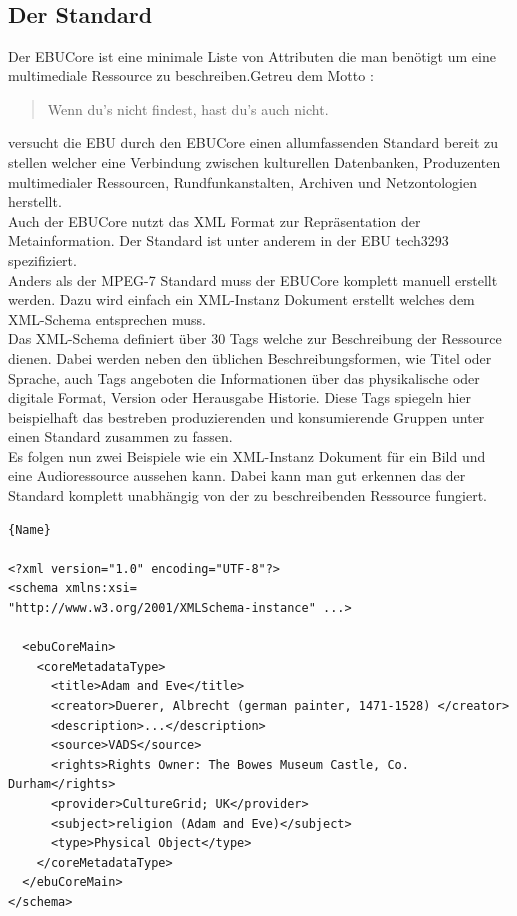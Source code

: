 	\subsection{\\Der Standard\\}
	Der EBUCore ist eine minimale Liste von Attributen die man benötigt um eine multimediale Ressource zu beschreiben.Getreu dem Motto :\begin{quote}Wenn du's nicht findest, hast du's auch nicht.\end{quote} versucht die EBU durch den EBUCore einen allumfassenden Standard bereit zu stellen welcher eine Verbindung zwischen kulturellen Datenbanken, Produzenten multimedialer Ressourcen, Rundfunkanstalten, Archiven und Netzontologien herstellt.\\
Auch der EBUCore nutzt das XML Format zur Repräsentation der Metainformation. Der Standard ist unter anderem in der EBU tech3293 spezifiziert.\\Anders als der MPEG-7 Standard muss der EBUCore komplett manuell erstellt werden. Dazu wird einfach ein XML-Instanz Dokument erstellt welches dem XML-Schema entsprechen muss.\\Das XML-Schema definiert über 30 Tags welche zur Beschreibung der Ressource dienen. Dabei werden neben den üblichen Beschreibungsformen, wie Titel oder Sprache, auch Tags angeboten die Informationen über das physikalische oder digitale  Format, Version oder Herausgabe Historie. Diese Tags spiegeln hier beispielhaft das bestreben produzierenden und konsumierende Gruppen unter einen Standard zusammen zu fassen.\\
Es folgen nun zwei Beispiele wie ein XML-Instanz Dokument für ein Bild und eine Audioressource aussehen kann. Dabei kann man gut erkennen das der Standard komplett unabhängig von der zu beschreibenden Ressource fungiert.

\begin{lstlisting}[caption=Beispiel-XML EBUCore für Albrecht Dürers Bild: Adam und Eva]{Name}

<?xml version="1.0" encoding="UTF-8"?>
<schema xmlns:xsi=
"http://www.w3.org/2001/XMLSchema-instance" ...>

  <ebuCoreMain>
    <coreMetadataType>
      <title>Adam and Eve</title>
      <creator>Duerer, Albrecht (german painter, 1471-1528) </creator>
      <description>...</description>
      <source>VADS</source>  
      <rights>Rights Owner: The Bowes Museum Castle, Co. Durham</rights>
      <provider>CultureGrid; UK</provider>
      <subject>religion (Adam and Eve)</subject>
      <type>Physical Object</type>
    </coreMetadataType>
  </ebuCoreMain>
</schema>
\end{lstlisting}


